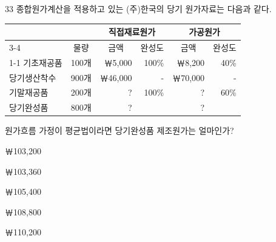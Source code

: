 \begin{question}{33}
종합원가계산을 적용하고 있는 (주)한국의 당기 원가자료는 다음과 같다.

{\small\centering
\begin{tabular}{@{}l r r r r r@{}}
\hline
 & & \multicolumn{2}{c}{직접재료원가} & \multicolumn{2}{c}{가공원가} \\
\cline{3-4}\cline{5-6}
\multicolumn{1}{c}{구분} & \multicolumn{1}{c}{물량} & \multicolumn{1}{c}{금액} & \multicolumn{1}{c}{완성도} & \multicolumn{1}{c}{금액} & \multicolumn{1}{c}{완성도} \\
\cline{1-1}\cline{2-2}\cline{3-3}\cline{4-4}\cline{5-5}\cline{6-6}
기초재공품 & 100개 & ￦5,000 & 100\% & ￦8,200 & 40\% \\
당기생산착수 & 900개 & ￦46,000 & - & ￦70,000 & - \\
기말재공품 & 200개 & ? & 100\% & ? & 60\% \\
당기완성품 & 800개 & ? & & ? & \\
\hline
\end{tabular}\par}
원가흐름 가정이 평균법이라면 당기완성품 제조원가는 얼마인가? \par
\begin{choices}
  \item ￦103,200
  \item ￦103,360
  \item ￦105,400
  \item ￦108,800
  \item ￦110,200
\end{choices}
\end{question}

